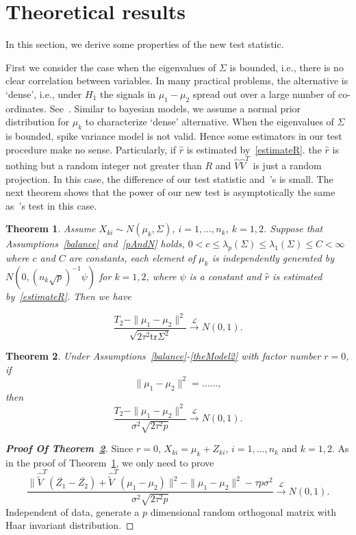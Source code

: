 \documentclass[review]{elsarticle}
\theoremstyle{plain}
\newtheorem{theorem}{\quad\quad Theorem}
\theoremstyle{definition}
\theoremstyle{remark}
\begin{document}
\section{Theoretical results}

In this section, we derive some properties of the new test statistic.


First we consider the case  when the eigenvalues of $\Sigma$ is bounded, i.e., there is no clear correlation between variables.
In many practical problems, the alternative is `dense', i.e., under $H_1$ the signals in $\mu_1-\mu_2$ spread out over a large number of co-ordinates. See~\cite{Tony2013}.
Similar to bayesian models, we assume a normal prior distribution for $\mu_k$ to characterize `dense' alternative.
When the eigenvalues of $\Sigma$ is bounded, spike variance model is not valid. Hence some estimators in our test procedure make no sense. Particularly, if  $\hat{r}$ is estimated by~\eqref{estimateR}. the $\hat{r}$ is nothing but a random integer not greater than $R$ and $\hat{V}\hat{V}^T$ is just a random projection. In this case, the difference of our test statistic and~\cite{Chen2010A}'s is small.
The next theorem shows that  the power of our new test is asymptotically the same as~\cite{Chen2010A}'s test in this case.


\begin{theorem}\label{sameTheorem}
   Assume $X_{ki}\sim N(\mu_k,\Sigma)$,  $i=1,\ldots,n_k$, $k=1,2$.
    Suppose that Assumptions~\ref{balance} and~\ref{pAndN} holds, $0<c\leq\lambda_p(\Sigma)\leq\lambda_1(\Sigma)\leq C<\infty$ where $c$ and $C$ are constants, each element of $\mu_k$ is independently generated by $N(0,{(n_k\sqrt{p})}^{-1}\psi)$ for $k=1,2$, where $\psi$ is a constant and  $\hat{r}$ is estimated by~\eqref{estimateR}.
    Then we have
    
\begin{equation*}
    \frac{T_2-\|\mu_1-\mu_2\|^2}{\sqrt{2\tau^2 \mathrm{tr}\Sigma^2}} \xrightarrow{\mathcal{L}} N(0,1).
\end{equation*}
\end{theorem}

\begin{theorem}\label{sameTheorem2}
    Under Assumptions~\ref{balance}-\ref{theModel2} with factor number $r=0$, if
    $$
    \|\mu_1-\mu_2\|^2=......,
    $$
    then
    $$
    \frac{T_2-\|\mu_1-\mu_2\|^2}{\sigma^2\sqrt{2\tau^2 p}}\xrightarrow{\mathcal{L}} N(0,1).
    $$
\end{theorem}
\begin{proof}[\textbf{Proof Of Theorem~\ref{sameTheorem2}}]
    Since $r=0$, $X_{ki}=\mu_k+Z_{ki}$, $i=1,\ldots,n_k$ and $k=1,2$.
    As in the proof of Theorem~\ref{sameTheorem}, we only need to prove
    $$
    \frac{\|\hat{\tilde{V}}^T(\bar{Z_1}-\bar{Z_2})+\hat{\tilde{V}}^T(\mu_1-\mu_2)\|^2-\|\mu_1-\mu_2\|^2-\tau p \sigma^2}{\sigma^2\sqrt{2\tau^2 p}}\xrightarrow{\mathcal{L}}N(0,1).
    $$
    Independent of data, generate a $p$ dimensional random orthogonal matrix with Haar invariant distribution.
\end{proof}
\end{document}
